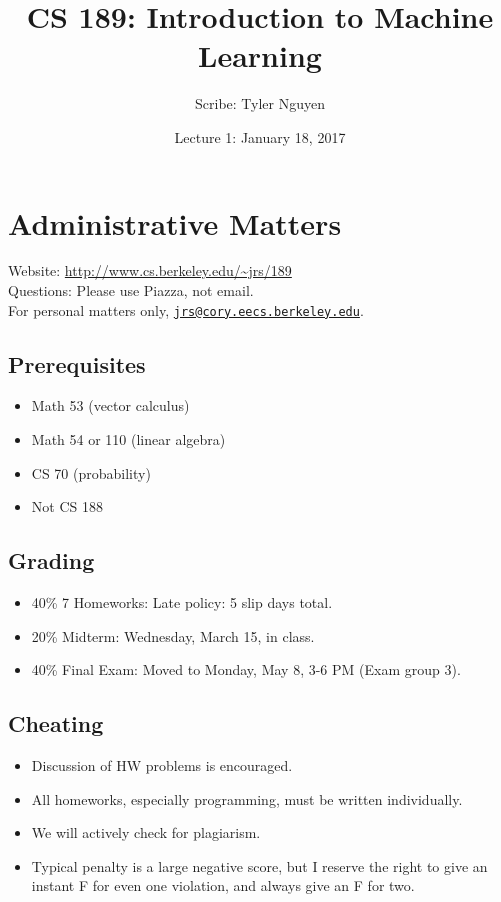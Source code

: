 \documentclass{article}
\begin{document}
\title{CS 189: Introduction to Machine Learning}
\author{Scribe: Tyler Nguyen}
\date{Lecture 1: January 18, 2017}
\maketitle
\section*{Administrative Matters}
Website: \url{http://www.cs.berkeley.edu/~jrs/189}\\
Questions: Please use Piazza, not email.\\
For personal matters only, \href{mailto:jrs@cory.eecs.berkeley.edu}{\nolinkurl{jrs@cory.eecs.berkeley.edu}}.
\subsection*{Prerequisites}
\begin{itemize}
\item Math 53 (vector calculus)
\item Math 54 or 110 (linear algebra)
\item CS 70 (probability)
\item Not CS 188
\end{itemize}
\subsection*{Grading}
\begin{itemize}
\item 40\% 7 Homeworks:  Late policy: 5 slip days total.
\item 20\% Midterm: Wednesday, March 15, in class.
\item 40\% Final Exam: Moved to Monday, May 8, 3-6 PM (Exam group 3).
\end{itemize}
\subsection*{Cheating}
\begin{itemize}
\item Discussion of HW problems is encouraged.
\item All homeworks, especially programming, must be written individually.
\item We will actively check for plagiarism.
\item Typical penalty is a large negative score, but I reserve the right to give an instant F for even one violation, and always give an F for two.
\end{itemize}
\end{document}
